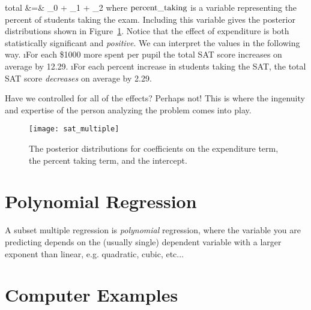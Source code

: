 \beqn
{\rm total} &=& \beta_{0} + \beta_{1} + \beta_{2}
\eeqn
where $\rm percent\_taking$ is a variable representing the percent of students taking the exam.  Including this variable gives the posterior distributions shown in Figure~\ref{fig:sat_multiple}.  Notice that the effect of expenditure is both statistically significant and \emph{positive}.  We can interpret the values in the following way.
\bi
\i For each \$1000 more spent per pupil the total SAT score increases on average by 12.29.
\i For each percent increase in students taking the SAT, the total SAT score \emph{decreases} on average by 2.29.
\ei

Have we controlled for all of the effects?  Perhaps not!  This is where the ingenuity and expertise of the person analyzing the problem comes into play.


\begin{figure}
\texttt{[image: sat\_multiple]}
\caption{The posterior distributions for coefficients on the expenditure term, the percent taking term, and the intercept.}\label{fig:sat_multiple}
\end{figure}

\section{Polynomial Regression}

A subset multiple regression is \emph{polynomial} regression, where the variable you are predicting depends on the (usually single) dependent variable with a larger exponent than linear, e.g. quadratic, cubic, etc...

\section{Computer Examples}
\begin{fullwidth}

\end{fullwidth}